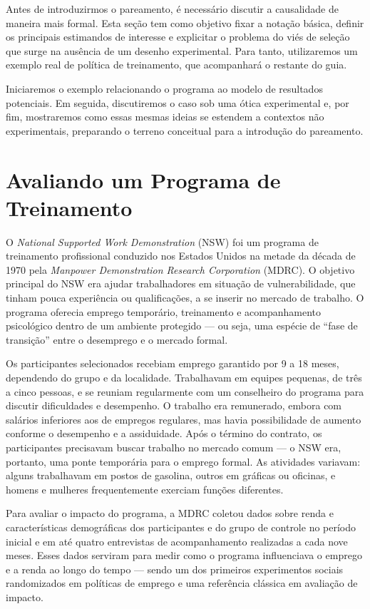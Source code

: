 Antes de introduzirmos o pareamento, é necessário discutir a causalidade de maneira mais formal. Esta seção tem como objetivo fixar a notação básica, definir os principais estimandos de interesse e explicitar o problema do viés de seleção que surge na ausência de um desenho experimental. Para tanto, utilizaremos um exemplo real de política de treinamento, que acompanhará o restante do guia.

Iniciaremos o exemplo relacionando o programa ao modelo de resultados potenciais. Em seguida, discutiremos o caso sob uma ótica experimental e, por fim, mostraremos como essas mesmas ideias se estendem a contextos não experimentais, preparando o terreno conceitual para a introdução do pareamento.

\section{Avaliando um Programa de Treinamento}

O \textit{National Supported Work Demonstration} (NSW) foi um programa de treinamento profissional conduzido nos Estados Unidos na metade da década de 1970 pela \textit{Manpower Demonstration Research Corporation} (MDRC). O objetivo principal do NSW era ajudar trabalhadores em situação de vulnerabilidade, que tinham pouca experiência ou qualificações, a se inserir no mercado de trabalho. O programa oferecia emprego temporário, treinamento e acompanhamento psicológico dentro de um ambiente protegido — ou seja, uma espécie de “fase de transição” entre o desemprego e o mercado formal.

Os participantes selecionados recebiam emprego garantido por 9 a 18 meses, dependendo do grupo e da localidade. Trabalhavam em equipes pequenas, de três a cinco pessoas, e se reuniam regularmente com um conselheiro do programa para discutir dificuldades e desempenho. O trabalho era remunerado, embora com salários inferiores aos de empregos regulares, mas havia possibilidade de aumento conforme o desempenho e a assiduidade. Após o término do contrato, os participantes precisavam buscar trabalho no mercado comum — o NSW era, portanto, uma ponte temporária para o emprego formal. As atividades variavam: alguns trabalhavam em postos de gasolina, outros em gráficas ou oficinas, e homens e mulheres frequentemente exerciam funções diferentes.


Para avaliar o impacto do programa, a MDRC coletou dados sobre renda e características demográficas dos participantes e do grupo de controle no período inicial e em até quatro entrevistas de acompanhamento realizadas a cada nove meses.
Esses dados serviram para medir como o programa influenciava o emprego e a renda ao longo do tempo — sendo um dos primeiros experimentos sociais randomizados em políticas de emprego e uma referência clássica em avaliação de impacto.

